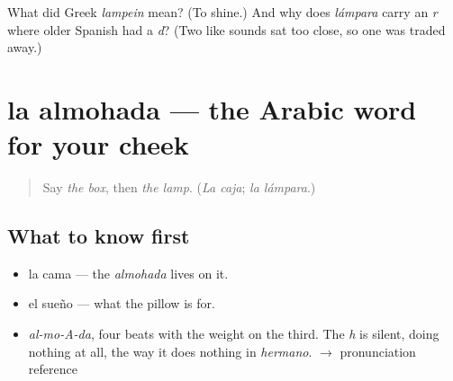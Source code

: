 \begin{tcolorbox}[breakable,colback=teal!4,colframe=teal!35!black,title={Before you move on}]
What did Greek \emph{lampein} mean? (To shine.) And why does \emph{lámpara} carry an \emph{r} where older Spanish had a \emph{d}? (Two like sounds sat too close, so one was traded away.)
\end{tcolorbox}
\section[la almohada]{la almohada — the Arabic word for your cheek}

\label{lesson:ES-C366-almohada}



\begin{quote}
Say \emph{the box}, then \emph{the lamp}. (\emph{La caja}; \emph{la lámpara}.)
\end{quote}

\subsection*{What to know first}
\begin{itemize}
\raggedright
  \item la cama — the \emph{almohada} lives on it.
  \item el sueño — what the pillow is for.
\end{itemize}

\begin{sounds}
\begin{itemize}
\raggedright
  \item \emph{al-mo-A-da}, four beats with the weight on the third. The \emph{h} is silent, doing nothing at all, the way it does nothing in \emph{hermano}. $\to$ pronunciation reference
\end{itemize}
\end{sounds}

